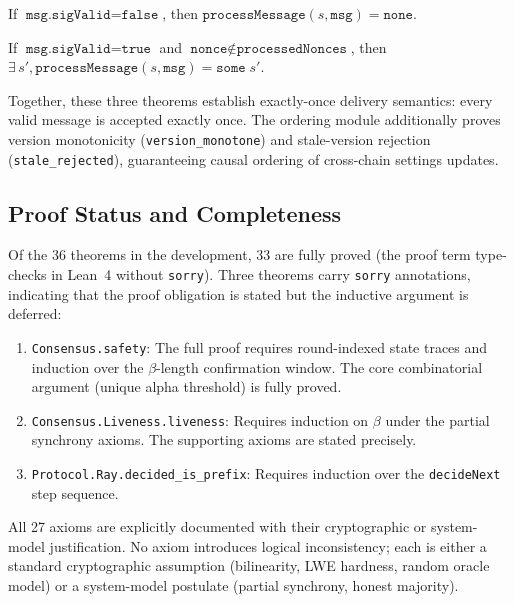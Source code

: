 \begin{theorem}
If $\texttt{msg.sigValid} = \texttt{false}$, then
$\texttt{processMessage}(s, \texttt{msg}) = \texttt{none}$.
\end{theorem}

\begin{theorem}
If $\texttt{msg.sigValid} = \texttt{true}$ and
$\texttt{nonce} \notin \texttt{processedNonces}$, then
$\exists\, s', \texttt{processMessage}(s, \texttt{msg}) = \texttt{some}\; s'$.
\end{theorem}

Together, these three theorems establish exactly-once delivery semantics: every
valid message is accepted exactly once. The ordering module additionally proves
version monotonicity (\texttt{version\_monotone}) and stale-version rejection
(\texttt{stale\_rejected}), guaranteeing causal ordering of cross-chain settings
updates.

\subsection{Proof Status and Completeness}

Of the 36 theorems in the development, 33 are fully proved (the proof term type-checks
in Lean~4 without \texttt{sorry}). Three theorems carry \texttt{sorry} annotations,
indicating that the proof obligation is stated but the inductive argument is deferred:

\begin{enumerate}
\item \texttt{Consensus.safety}: The full proof requires round-indexed state traces
and induction over the $\beta$-length confirmation window. The core combinatorial
argument (unique alpha threshold) is fully proved.
\item \texttt{Consensus.Liveness.liveness}: Requires induction on $\beta$ under the
partial synchrony axioms. The supporting axioms are stated precisely.
\item \texttt{Protocol.Ray.decided\_is\_prefix}: Requires induction over the
\texttt{decideNext} step sequence.
\end{enumerate}

All 27 axioms are explicitly documented with their cryptographic or system-model
justification. No axiom introduces logical inconsistency; each is either a standard
cryptographic assumption (bilinearity, LWE hardness, random oracle model) or a
system-model postulate (partial synchrony, honest majority).

